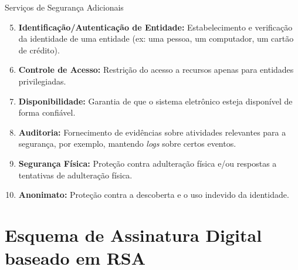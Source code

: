 \documentclass{beamer}
\begin{document}
\begin{frame}{Serviços de Segurança Adicionais}

    \begin{enumerate}
        \setcounter{enumi}{4} 
        
        \item<+-> \textbf{Identificação/Autenticação de Entidade:} Estabelecimento e verificação da identidade de uma entidade (ex: uma pessoa, um computador, um cartão de crédito).
        
        \item<+-> \textbf{Controle de Acesso:} Restrição do acesso a recursos apenas para entidades privilegiadas.
        
        \item<+-> \textbf{Disponibilidade:} Garantia de que o sistema eletrônico esteja disponível de forma confiável.
        
        \item<+-> \textbf{Auditoria:} Fornecimento de evidências sobre atividades relevantes para a segurança, por exemplo, mantendo \textit{logs} sobre certos eventos.
        
        \item<+-> \textbf{Segurança Física:} Proteção contra adulteração física e/ou respostas a tentativas de adulteração física.
        
        \item<+-> \textbf{Anonimato:} Proteção contra a descoberta e o uso indevido da identidade.
    \end{enumerate}

\end{frame}

\section{Esquema de Assinatura Digital baseado em RSA}
\end{document}
